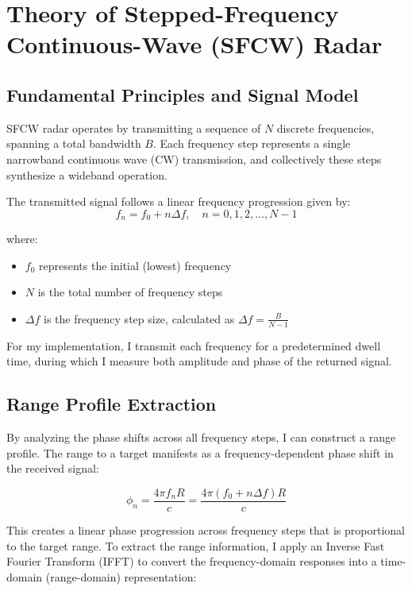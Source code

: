 \documentclass[11pt,a4paper]{article}
\begin{document}
\section{Theory of Stepped-Frequency Continuous-Wave (SFCW) Radar}

\subsection{Fundamental Principles and Signal Model}

SFCW radar operates by transmitting a sequence of $N$ discrete frequencies, spanning a total bandwidth $B$. Each frequency step represents a single narrowband continuous wave (CW) transmission, and collectively these steps synthesize a wideband operation.

The transmitted signal follows a linear frequency progression given by:
\begin{equation}
    f_n = f_0 + n \Delta f,\quad n = 0, 1, 2, \ldots, N-1
\end{equation}

where:
\begin{itemize}
    \item $f_0$ represents the initial (lowest) frequency
    \item $N$ is the total number of frequency steps
    \item $\Delta f$ is the frequency step size, calculated as $\Delta f = \frac{B}{N-1}$
\end{itemize}

For my implementation, I transmit each frequency for a predetermined dwell time, during which I measure both amplitude and phase of the returned signal.

\subsection{Range Profile Extraction}

By analyzing the phase shifts across all frequency steps, I can construct a range profile. The range to a target manifests as a frequency-dependent phase shift in the received signal:

\begin{equation}
    \phi_n = \frac{4\pi f_n R}{c} = \frac{4\pi (f_0 + n\Delta f) R}{c}
\end{equation}

This creates a linear phase progression across frequency steps that is proportional to the target range. To extract the range information, I apply an Inverse Fast Fourier Transform (IFFT) to convert the frequency-domain responses into a time-domain (range-domain) representation:
\end{document}
